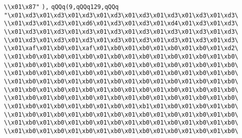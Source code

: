 \verb|\\x01\x87"|\newline
\verb|),|\newline
\verb|qQQq(9,qQQq129,qQQq|\newline
\verb|"\x01\xd3\x01\xd3\x01\xd3\x01\xd3\x01\xd3\x01\xd3\x01\xd3\x01\xd3\|\newline
\verb|\\x01\xd3\x01\xd3\x01\xd6\x01\xd3\x01\xd3\x01\xd4\x01\xd3\x01\xd3\|\newline
\verb|\\x01\xd3\x01\xd3\x01\xd3\x01\xd3\x01\xd3\x01\xd3\x01\xd3\x01\xd3\|\newline
\verb|\\x01\xd3\x01\xd3\x01\xd3\x01\xd3\x01\xd3\x01\xd3\x01\xd3\x01\xd3\|\newline
\verb|\\x01\xaf\x01\xb0\x01\xaf\x01\xb0\x01\xb0\x01\xb0\x01\xb0\x01\xd2\|\newline
\verb|\\x01\xb0\x01\xb0\x01\xb0\x01\xb0\x01\xb0\x01\xb0\x01\xb0\x01\xb0\|\newline
\verb|\\x01\xb0\x01\xb0\x01\xb0\x01\xb0\x01\xb0\x01\xb0\x01\xb0\x01\xb0\|\newline
\verb|\\x01\xb0\x01\xb0\x01\xb0\x01\xb0\x01\xb0\x01\xb0\x01\xb0\x01\xb0\|\newline
\verb|\\x01\xb0\x01\xb0\x01\xb0\x01\xb0\x01\xb0\x01\xb0\x01\xb0\x01\xb0\|\newline
\verb|\\x01\xb0\x01\xb0\x01\xb0\x01\xb0\x01\xb0\x01\xb0\x01\xb0\x01\xb0\|\newline
\verb|\\x01\xb0\x01\xb0\x01\xb0\x01\xb0\x01\xb0\x01\xb0\x01\xb0\x01\xb0\|\newline
\verb|\\x01\xb0\x01\xb0\x01\xb0\x01\xb0\x01\xb1\x01\xb0\x01\xb0\x01\xb0\|\newline
\verb|\\x01\xb0\x01\xb0\x01\xb0\x01\xb0\x01\xb0\x01\xb0\x01\xb0\x01\xb0\|\newline
\verb|\\x01\xb0\x01\xb0\x01\xb0\x01\xb0\x01\xb0\x01\xb0\x01\xb0\x01\xb0\|\newline
\verb|\\x01\xb0\x01\xb0\x01\xb0\x01\xb0\x01\xb0\x01\xb0\x01\xb0\x01\xb0\|\newline
